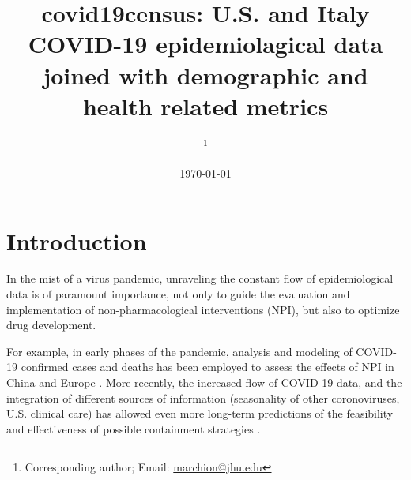 \documentclass[12pt,halfline,a4paper,]{ouparticle}
\begin{document}
\title{covid19census: U.S. and Italy COVID-19 epidemiolagical data joined with
demographic and health related metrics}

\author{%
\address{Department of Oncology, Johns Hopkins University School of Medicine,
Baltimore, MD, USA}
\and
{}\address{Department of Oncology, Johns Hopkins University School of Medicine,
Baltimore, MD, USA}\thanks{Corresponding author; Email: \href{mailto:marchion@jhu.edu}{marchion@jhu.edu}}
\and
{}\address{Another University}
}


\date{\today}


\maketitle



\hypertarget{introduction}{%
\section{Introduction}\label{introduction}}

In the mist of a virus pandemic, unraveling the constant flow of
epidemiological data is of paramount importance, not only to guide the
evaluation and implementation of non-pharmacological interventions
(NPI), but also to optimize drug development.

For example, in early phases of the pandemic, analysis and modeling of
COVID-19 confirmed cases and deaths has been employed to assess the
effects of NPI in China and Europe \citep{flaxman2020, prem2020tlph}.
More recently, the increased flow of COVID-19 data, and the integration
of different sources of information (seasonality of other coronoviruses,
U.S. clinical care) has allowed even more long-term predictions of the
feasibility and effectiveness of possible containment strategies
\citep{kissler2020s}.
\end{document}
